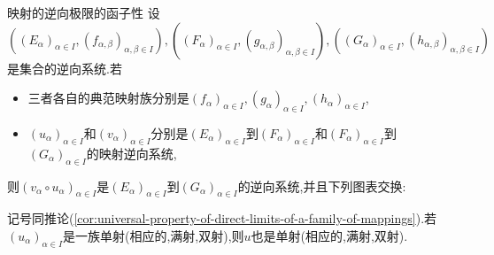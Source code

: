\begin{corollary}{映射的逆向极限的函子性}{}
	设$\left(\left(E_{\alpha}\right)_{\alpha\in I},\left(f_{\alpha,\beta}\right)_{\alpha,\beta\in I}\right),\left(\left(F_{\alpha}\right)_{\alpha\in I},\left(g_{\alpha,\beta}\right)_{\alpha,\beta\in I}\right),\left(\left(G_{\alpha}\right)_{\alpha\in I},\left(h_{\alpha,\beta}\right)_{\alpha,\beta\in I}\right)$是集合的逆向系统.若
	\begin{itemize}
		\item 三者各自的典范映射族分别是$\left(f_{\alpha}\right)_{\alpha\in I},\left(g_{\alpha}\right)_{\alpha\in I},\left(h_{\alpha}\right)_{\alpha\in I}$,
		\item $\left(u_{\alpha}\right)_{\alpha\in I}$和$\left(v_{\alpha}\right)_{\alpha\in I}$分别是$\left(E_{\alpha}\right)_{\alpha\in I}$到$\left(F_{\alpha}\right)_{\alpha\in I}$和$\left(F_{\alpha}\right)_{\alpha\in I}$到$\left(G_{\alpha}\right)_{\alpha\in I}$的映射逆向系统,
	\end{itemize}
	则$\left(v_{\alpha}\circ u_{\alpha}\right)_{\alpha\in I}$是$\left(E_{\alpha}\right)_{\alpha\in I}$到$\left(G_{\alpha}\right)_{\alpha\in I}$的逆向系统,并且下列图表交换:
	\begin{center}
	\end{center}
\end{corollary}

\begin{corollary}{}{}
	记号同推论(\ref{cor:universal-property-of-direct-limits-of-a-family-of-mappings}).若$\left(u_{\alpha}\right)_{\alpha\in I}$是一族单射(相应的,满射,双射),则$u$也是单射(相应的,满射,双射).
\end{corollary}

